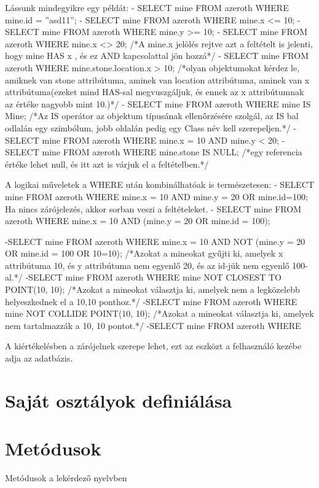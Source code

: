 Lássunk mindegyikre egy példát:
- SELECT mine FROM azeroth WHERE mine.id = ”asd11”;
- SELECT mine FROM azeroth WHERE mine.x <= 10;
- SELECT mine FROM azeroth WHERE mine.y >= 10;
- SELECT mine FROM azeroth WHERE mine.x <> 20; /*A mine.x jelölés rejtve azt a feltételt is jelenti, hogy mine HAS x , és ez AND kapcsolattal jön hozzá*/
- SELECT mine FROM azeroth WHERE mine.stone.location.x > 10; /*olyan objektumokat kérdez le, amiknek van stone attribútuma, aminek van location attribútuma, aminek van x attribútuma(ezeket mind HAS-sal megvuszgáljuk, és ennek az x attribútumnak az értéke nagyobb mint 10.)*/
- SELECT mine FROM azeroth WHERE mine IS Mine; /*Az IS operátor az objektum típusának ellenőrzésére szolgál, az IS bal odlalán egy szimbólum, jobb oldalán pedig egy Class név kell szerepeljen.*/
- SELECT mine FROM azeroth WHERE mine.x = 10 AND mine.y < 20;
- SELECT mine FROM azeroth WHERE mine.stone IS NULL;  /*egy referencia értéke lehet null, és itt azt is várjuk el a feltételben.*/

A logikai műveletek a WHERE után kombinálhatóak is természetesen:
- SELECT mine FROM azeroth WHERE mine.x = 10 AND mine.y = 20 OR mine.id=100;
Ha nincs zárójelezés, akkor sorban veszi a feltételeket.
- SELECT mine FROM azeroth WHERE mine.x = 10 AND (mine.y = 20 OR mine.id = 100);

-SELECT mine FROM azeroth WHERE mine.x = 10 AND NOT (mine.y = 20 OR mine.id = 100 OR 10=10);  /*Azokat a mineokat gyűjti ki, amelyek x attribútuma 10, és y attribútuma nem egyenlő 20, és az id-jük nem egyenlő 100-al.*/
-SELECT mine FROM azeroth WHERE mine NOT CLOSEST TO POINT(10, 10); /*Azokat a mineokat választja ki, amelyek nem a legközelebb helyeszkednek el a 10,10 ponthoz.*/
-SELECT mine FROM azeroth WHERE mine NOT COLLIDE POINT(10, 10);
/*Azokat a mineokat választja ki, amelyek nem tartalmazzák a 10, 10 pontot.*/
-SELECT mine FROM azeroth WHERE 

A kiértékelésben a zárójelnek szerepe lehet, ezt az eszközt a felhasználó kezébe adja az adatbázis.

\section{Saját osztályok definiálása}

\section{Metódusok}

Metódusok a lekérdező nyelvben

